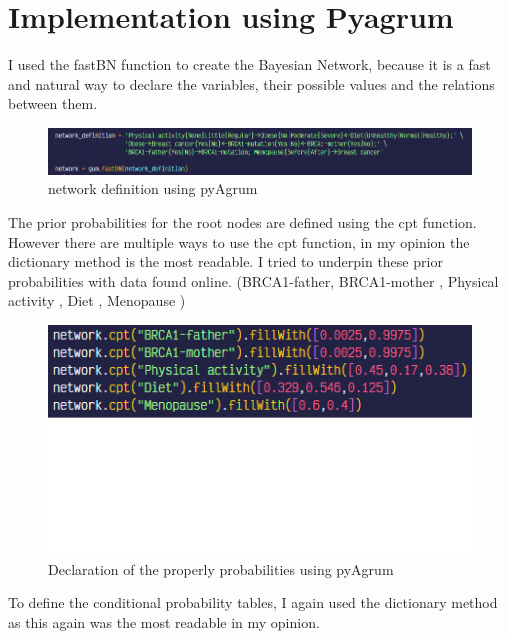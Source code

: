 \documentclass{article}
\begin{document}
\section{Implementation using Pyagrum}
I used the fastBN function to create the Bayesian Network, because it is a fast and natural way to declare the variables, their possible values and the relations between them.
\begin{figure}[H]
    \centering
    \includegraphics[width=\textwidth]{../figures/network_definition.png}
    \caption{network definition using pyAgrum}
    \label{fig:bayesian_network}
\end{figure}

The prior probabilities for the root nodes are defined using the cpt function. However there are multiple ways to use the cpt function, in my opinion the dictionary method is the most readable.
I tried to underpin these prior probabilities with data found online. (BRCA1-father, BRCA1-mother \cite{cancergov}, Physical activity \cite{eucommission}, Diet \cite{eurostat2}, Menopause \cite{ourworldindata})

\begin{figure}[H]
    \centering
    \includegraphics[width=\textwidth]{../figures/prior_declaration.png}
    \caption{Declaration of the properly probabilities using pyAgrum}
    \label{fig:prior_declaration}
\end{figure}
To define the conditional probability tables, I again used the dictionary method as this again was the most readable in my opinion.
\end{document}
